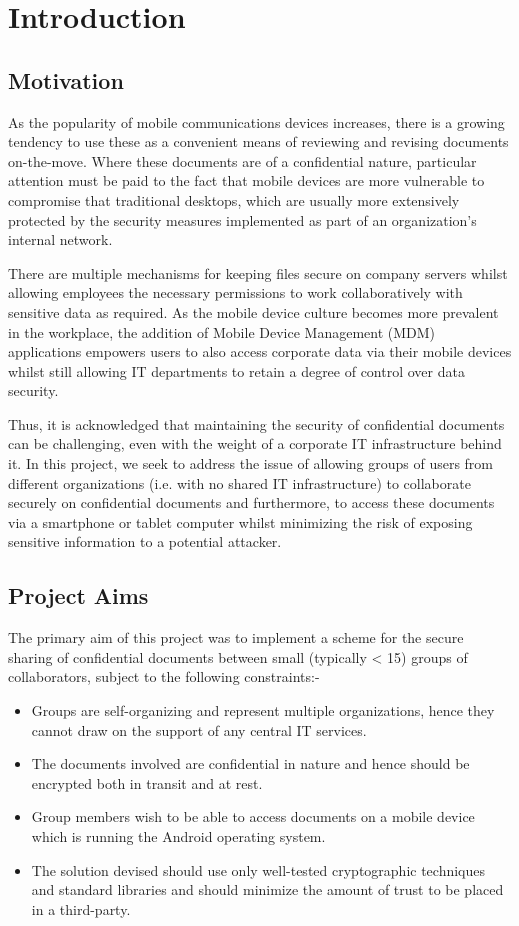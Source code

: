 
\chapter{Introduction}
\label{cha:introduction}
\section{Motivation}
\label{sec:motivation}
As the popularity of mobile communications devices increases, there is a growing tendency to use these as a convenient means of reviewing and revising documents on-the-move. Where these documents are of a confidential nature, particular attention must be paid to the fact that mobile devices are more vulnerable to compromise that traditional desktops, which are usually more extensively protected by the security measures implemented as part of an organization's internal network. 

There are multiple mechanisms for keeping files secure on company servers whilst allowing employees the necessary permissions to work collaboratively with sensitive data as required.  As the mobile device culture becomes more prevalent in the workplace, the addition of Mobile Device Management (MDM) applications empowers users to also access corporate data via their mobile devices whilst still allowing IT departments to retain a degree of control over data security.  

Thus, it is acknowledged that maintaining the security of confidential documents can be challenging, even with the weight of a corporate IT infrastructure behind it.  In this project, we seek to address the issue of allowing groups of users from different organizations (i.e. with no shared IT infrastructure) to collaborate securely on confidential documents and furthermore, to access these documents via a smartphone or tablet computer whilst minimizing the risk of exposing sensitive information to a potential attacker.


\section{Project Aims}
\label{sec:aims}
The primary aim of this project was to implement a scheme for the secure sharing of confidential documents between small (typically < 15) groups of collaborators, subject to the following constraints:-
\begin{itemize}
\item Groups are self-organizing and represent multiple organizations, hence they cannot draw on the support of any central IT services.
\item The documents involved are confidential in nature and hence should be encrypted both in transit and at rest.
\item Group members wish to be able to access documents on a mobile device which is running the Android operating system.
\item The solution devised should use only well-tested cryptographic techniques and standard libraries and should minimize the amount of trust to be placed in a third-party.
\end{itemize}

